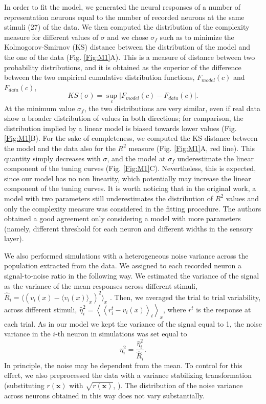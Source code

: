 \documentclass[a4paper]{article}%
\begin{document}
In order to fit the model, we generated the neural responses of a number of
representation neurons equal to the number of recorded neurons at the same
stimuli (27) of the data. We then computed the distribution of the complexity
measure for different values of $\sigma$ and we chose $\sigma_{f}$ such as to
minimize the Kolmogorov-Smirnov (KS) distance between the distribution of the
model and the one of the data (Fig. \ref{Fig:M1}A).  This is a measure of distance between two probability distributions, and it is obtained as the superior of the difference between the two empirical cumulative distribution functions, $F_{model}(c)$ and $F_{data}(c)$,
\begin{equation}
KS (\sigma) = \sup_c |F_{model}(c) - F_{data}(c)|.
\end{equation}
At the minimum value $\sigma_{f}$, the
two distributions are very similar, even if real data show a broader
distribution of values in both directions; for comparison, the distribution
implied by a linear model is biased towards lower values (Fig. \ref{Fig:M1}B).
For the sake of completeness, we computed the KS distance between the model
and the data also for the $R^{2}$ measure (Fig. \ref{Fig:M1}A, red line). This
quantity simply decreases with $\sigma$, and the model at $\sigma_{f}$
underestimate the linear component of the tuning curves (Fig. \ref{Fig:M1}C).
Nevertheless, this is expected, since our model has no non linearity, which
potentially may increase the linear component of the tuning curves. It is
worth noticing that in the original work, a model with two parameters still
underestimates the distribution of $R^{2}$ values and only the complexity
measure was considered in the fitting procedure. The authors obtained a good
agreement only considering a model with more parameters (namely, different
threshold for each neuron and different widths in the sensory layer).

We also performed simulations with a heterogeneous noise variance across the
population extracted from the data. We assigned to each recorded neuron a
signal-to-noise ratio in the following way. We estimated the variance of the
signal as the variance of the mean responses across different stimuli,
$\hat{R}_{i} = \langle\left(  v_{i}(x) - \langle v_{i}(x) \rangle_{x} \right)
^{2}\rangle_{x}$ . Then, we averaged the trial to trial variability, across
different stimuli, $\hat{\eta}^{2}_{i} = \left\langle \left\langle r^{t}%
_{i}-v_{i}(x)\right\rangle _{t}\right\rangle _{x}$, where $r^{t}$ is the
response at each trial. As in our model we kept the variance of the signal
equal to 1, the noise variance in the $i$-th neuron in simulations was set
equal to
\begin{equation}
\eta_{i}^{2} = \frac{\hat{\eta}_{i}^{2}}{\hat{R}_{i}}. \label{Eq:snr-data}%
\end{equation}
In principle, the noise may be dependent from the mean. To control for this
effect, we also preprocessed the data with a variance stabilizing
transformation (substituting $r(\mathbf{x}) $ with $\sqrt{r(\mathbf{x})}$,
\cite{SRJ1999TheStatistics}). The distribution of the noise variance across
neurons obtained in this way does not vary substantially.
\end{document}
